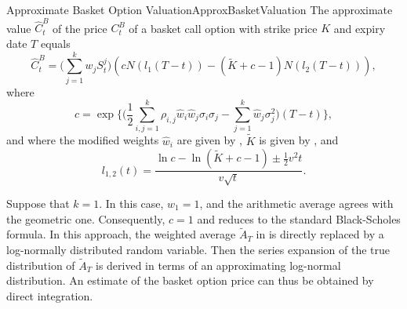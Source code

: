 \begin{prop}{Approximate Basket Option Valuation}{ApproxBasketValuation}
	The approximate value $\hat{C}_t^B$ of the price $C_t^B$ of a basket call option with strike price $K$ and expiry date $T$ equals
	\begin{equation} \label{eq:ApproxBasketCallPrice}
		\hat{C}_t^B = \biggl( \sum_{j=1}^k w_j S_t^j \biggr) (c N(l_1(T-t)) - (\tilde{K} + c - 1) N(l_2(T-t))),
	\end{equation}
	where
	\begin{equation} \label{eq:ParameterC}
		c = \exp \biggl\{ \biggl( \frac{1}{2} \sum_{i,j=1}^k \rho_{i,j} \hat{w}_i \hat{w}_j \sigma_i \sigma_j - \sum_{j=1}^k \hat{w}_j \sigma_j^2 \biggr) (T-t) \biggr\},
	\end{equation}
	and where the modified weights $\hat{w}_i$ are given by , $\tilde{K}$ is given by , and
	\begin{equation} \label{eq:LTermsDef}
		l_{1,2}(t) = \frac{\ln c - \ln(\tilde{K} + c - 1) \pm \frac{1}{2} v^2 t}{v \sqrt{t}}.
	\end{equation}
\end{prop}

Suppose that $k=1$. In this case, $w_1 = 1$, and the arithmetic average agrees with the geometric one. Consequently, $c=1$ and  reduces to the standard Black-Scholes formula. In this approach, the weighted average $\tilde{A}_T$ in  is directly replaced by a log-normally distributed random variable. Then the series expansion of the true distribution of $\tilde{A}_T$ is derived in terms of an approximating log-normal distribution. An estimate of the basket option price can thus be obtained by direct integration.

